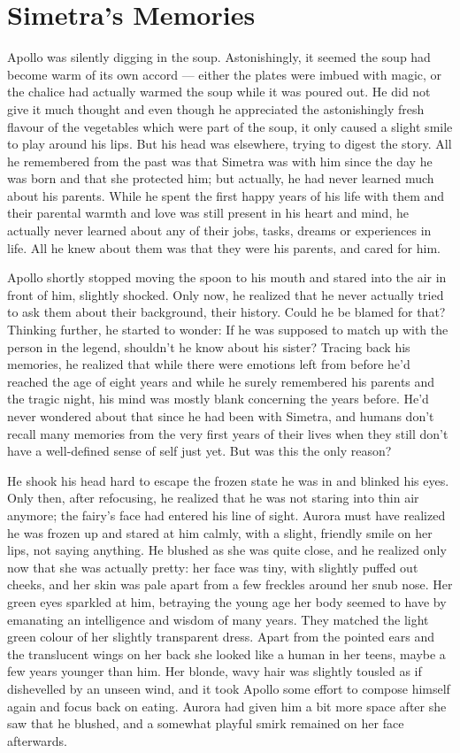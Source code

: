 \chapter{Simetra's Memories}
\label{cha:simetras-memories}
Apollo was silently digging in the soup. Astonishingly, it seemed the soup had become warm of its own accord --- either the plates were imbued with magic, or the chalice had actually warmed the soup while it was poured out. He did not give it much thought and even though he appreciated the astonishingly fresh flavour of the vegetables which were part of the soup, it only caused a slight smile to play around his lips. But his head was elsewhere, trying to digest the story. All he remembered from the past was that Simetra was with him since the day he was born and that she protected him; but actually, he had never learned much about his parents. While he spent the first happy years of his life with them and their parental warmth and love was still present in his heart and mind, he actually never learned about any of their jobs, tasks, dreams or experiences in life. All he knew about them was that they were his parents, and cared for him. 

Apollo shortly stopped moving the spoon to his mouth and stared into the air in front of him, slightly shocked. Only now, he realized that he never actually tried to ask them about their background, their history. Could he be blamed for that? Thinking further, he started to wonder: If he was supposed to match up with the person in the legend, shouldn't he know about his sister? Tracing back his memories, he realized that while there were emotions left from before he'd reached the age of eight years and while he surely remembered his parents and the tragic night, his mind was mostly blank concerning the years before. He'd never wondered about that since he had been with Simetra, and humans don't recall many memories from the very first years of their lives when they still don't have a well-defined sense of self just yet. But was this the only reason?

He shook his head hard to escape the frozen state he was in and blinked his eyes. Only then, after refocusing, he realized that he was not staring into thin air anymore; the fairy's face had entered his line of sight. Aurora must have realized he was frozen up and stared at him calmly, with a slight, friendly smile on her lips, not saying anything. He blushed as she was quite close, and he realized only now that she was actually pretty: her face was tiny, with slightly puffed out cheeks, and her skin was pale apart from a few freckles around her snub nose. Her green eyes sparkled at him, betraying the young age her body seemed to have by emanating an intelligence and wisdom of many years. They matched the light green colour of her slightly transparent dress. Apart from the pointed ears and the translucent wings on her back she looked like a human in her teens, maybe a few years younger than him. Her blonde, wavy hair was slightly tousled as if dishevelled by an unseen wind, and it took Apollo some effort to compose himself again and focus back on eating. Aurora had given him a bit more space after she saw that he blushed, and a somewhat playful smirk remained on her face afterwards.

